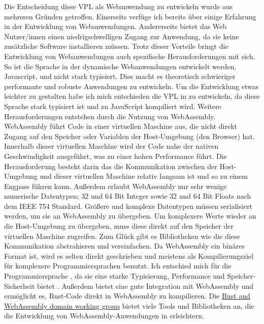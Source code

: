 \documentclass[ngerman]{article}
\begin{document}
Die Entscheidung diese VPL als Webanwendung zu entwickeln wurde aus mehreren Gründen getroffen. 
Einerseits verfüge ich bereits über einige Erfahrung in der Entwicklung von Webanwendungen. 
Andererseits bietet das Web Nutzer/innen einen niedrigschwelligen Zugang zur Anwendung, da sie keine zusätzliche Software installieren müssen.
\br
Trotz dieser Vorteile bringt die Entwicklung von Webanwendungen auch spezifische Herausforderungen mit sich.
So ist die Sprache in der dynamische Webanwendungen entwickelt werden, Javascript,  und nicht stark typisiert. 
Dies macht es theoretisch schwieriger performante und robuste Anwendungen zu entwickeln. 
Um die Entwicklung etwas leichter zu gestalten habe ich mich entschieden die VPL in  zu entwickeln, da diese Sprache stark typisiert ist und zu JavaScript kompiliert wird.
\br
Weitere Herausforderungen entstehen durch die Nutzung von WebAssembly. 
WebAssembly führt Code in einer virtuellen Maschine aus, die nicht direkt Zugang auf den Speicher oder Variablen der Host-Umgebung (den Browser) hat.
Innerhalb dieser virtuellen Maschine wird der Code nahe der nativen Geschwindigkeit ausgeführt, was zu einer hohen Performance führt. 
Die Herausforderung besteht darin das die Kommunikation zwischen der Host-Umgebung und dieser virtuellen Maschine relativ langsam ist und so zu einem Engpass führen kann.
\br
Außerdem erlaubt WebAssembly nur sehr wenige numerische Datentypen; 32 und 64 Bit Integer sowie 32 und 64 Bit Floats nach dem IEEE 754 Standard. 
Größere und komplexe Datentypen müssen serialisiert werden, um sie an WebAssembly zu übergeben. 
Um komplexere Werte wieder an die Host-Umgebung zu übergeben, muss diese direkt auf den Speicher der virtuellen Maschine zugreifen.
Zum Glück gibt es Bibliotheken wie  die diese Kommunikation abstrahieren und vereinfachen.
\br
Da WebAssembly ein binäres Format ist, wird es selten direkt geschrieben und meistens als Kompilierungsziel für komplexere Programmiersprachen benutzt.
Ich entschied mich für die Programmiersprache , da sie eine starke Typisierung, Performance und Speicher-Sicherheit bietet \cite{bugden2022rust}.
Außerdem bietet  eine gute Integration mit WebAssembly und ermöglicht es, Rust-Code direkt in WebAssembly zu kompilieren. 
Die \href{https://rustwasm.github.io/}{Rust and WebAssembly domain working group} bietet viele Tools und Bibliotheken an, die die Entwicklung von WebAssembly-Anwendungen in  erleichtern.
\end{document}
